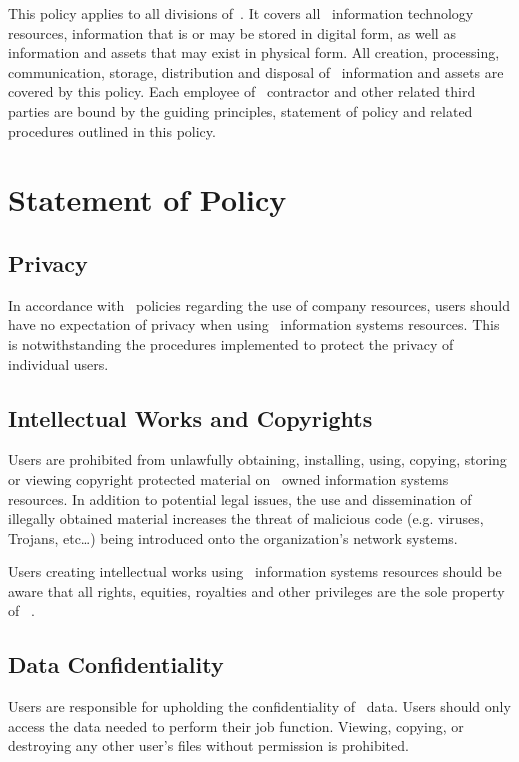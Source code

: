 \documentclass[use]{policy}
\begin{document}
		This policy applies to all divisions of \theOrganization\,.  It covers all \theOrganization\ information technology resources, information that is or may be stored in digital form, as well as information and assets that may exist in physical form.  All creation, processing, communication, storage, distribution and disposal of \theOrganization\ information and assets are covered by this policy.  Each employee of \theOrganization\, contractor and other related third parties are bound by the guiding principles, statement of policy and related procedures outlined in this policy. 
	
	
	\section{Statement of Policy}
	
		\subsection{Privacy}
			In accordance with \theOrganization\ policies regarding the use of company resources, users should have no expectation of privacy when using \theOrganization\  information systems resources.  This is notwithstanding the procedures implemented to protect the privacy of individual users.
		
		\subsection{Intellectual Works and Copyrights}
			Users are prohibited from unlawfully obtaining, installing, using, copying, storing or viewing copyright protected material on \theOrganization\  owned information systems resources.  In addition to potential legal issues, the use and dissemination of illegally obtained material increases the threat of malicious code (e.g. viruses, Trojans, etc…) being introduced onto the organization’s network systems. 
		 
			Users creating intellectual works using \theOrganization\  information systems resources should be aware that all rights, equities, royalties and other privileges are the sole property of \theOrganization\ .  
		
		\subsection{Data Confidentiality}
			Users are responsible for upholding the confidentiality of \theOrganization\  data.  Users should only access the data needed to perform their job function. Viewing, copying, or destroying any other user’s files without permission is prohibited.
	
\end{document}
